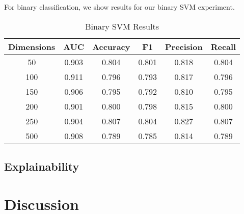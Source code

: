 \documentclass{article}
\begin{document}
For binary classification, we show results for our binary SVM
experiment.

\begin{table}
 \caption{Binary SVM Results}
  \centering
  \begin{tabular}{|c|c|c|c|c|c|}
    \hline
    \rowcolor{lightgray} \textbf{Dimensions} & \textbf{AUC} & \textbf{Accuracy} & \textbf{F1} & \textbf{Precision} & \textbf{Recall} \\
    \hline
    50 & 0.903 & 0.804 & 0.801 & 0.818 & 0.804 \\
    \hline
    100 & \cellcolor{green} 0.911 & 0.796 & 0.793 & 0.817 & 0.796 \\
    \hline
    150 & 0.906 & 0.795 & 0.792 & 0.810 & 0.795 \\
    \hline
    200 & 0.901 & 0.800 & 0.798 & 0.815 & 0.800 \\
    \hline
    \cellcolor{green} 250 & 0.904 & \cellcolor{green} 0.807 & \cellcolor{green} 0.804 & \cellcolor{green} 0.827 & \cellcolor{green} 0.807 \\
    \hline
    500 & 0.908 & 0.789 & 0.785 & 0.814 & 0.789 \\
    \hline
  \end{tabular}
  \label{tab:svm}
\end{table}

\hypertarget{explainability}{%
\subsection{Explainability}\label{explainability}}

\hypertarget{discussion}{%
\section{Discussion}\label{discussion}}

\label{sec:discuss}
\end{document}
